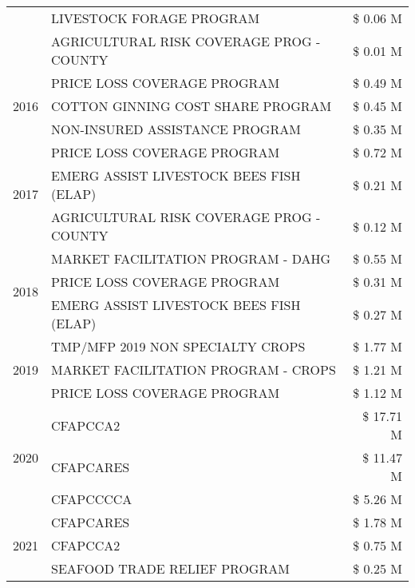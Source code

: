 \begin{tabular}{llr}
 & LIVESTOCK FORAGE PROGRAM & \$ 0.06 M \\
 & AGRICULTURAL RISK COVERAGE PROG - COUNTY & \$ 0.01 M \\
\cline{1-3}
\multirow[t]{3}{*}{2016} & PRICE LOSS COVERAGE PROGRAM                   & \$ 0.49 M \\
 & COTTON GINNING COST SHARE PROGRAM             & \$ 0.45 M \\
 & NON-INSURED ASSISTANCE PROGRAM                & \$ 0.35 M \\
\cline{1-3}
\multirow[t]{3}{*}{2017} & PRICE LOSS COVERAGE PROGRAM & \$ 0.72 M \\
 & EMERG ASSIST LIVESTOCK BEES FISH (ELAP) & \$ 0.21 M \\
 & AGRICULTURAL RISK COVERAGE PROG - COUNTY & \$ 0.12 M \\
\cline{1-3}
\multirow[t]{3}{*}{2018} & MARKET FACILITATION PROGRAM - DAHG & \$ 0.55 M \\
 & PRICE LOSS COVERAGE PROGRAM & \$ 0.31 M \\
 & EMERG ASSIST LIVESTOCK BEES FISH (ELAP) & \$ 0.27 M \\
\cline{1-3}
\multirow[t]{3}{*}{2019} & TMP/MFP 2019 NON SPECIALTY CROPS & \$ 1.77 M \\
 & MARKET FACILITATION PROGRAM - CROPS & \$ 1.21 M \\
 & PRICE LOSS COVERAGE PROGRAM & \$ 1.12 M \\
\cline{1-3}
\multirow[t]{3}{*}{2020} & CFAPCCA2 & \$ 17.71 M \\
 & CFAPCARES & \$ 11.47 M \\
 & CFAPCCCCA & \$ 5.26 M \\
\cline{1-3}
\multirow[t]{3}{*}{2021} & CFAPCARES & \$ 1.78 M \\
 & CFAPCCA2 & \$ 0.75 M \\
 & SEAFOOD TRADE RELIEF PROGRAM & \$ 0.25 M \\
\cline{1-3}
\bottomrule
\end{tabular}
